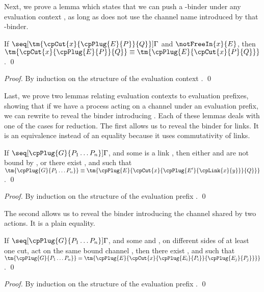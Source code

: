 \documentclass[UKenglish]{llncs}
\begin{document}
Next, we prove a lemma which states that we can push a \textnu-binder under any
evaluation context , as long as  does not use the channel name
introduced by that \textnu-binder.
\begin{lemma}\label{thm:cp-display-cut}
  If $\seq[{ \tm{\cpCut{x}{\cpPlug{E}{P}}{Q}} }]{ \Gamma }$ and
  $\notFreeIn{x}{E}$, then $\tm{\cpCut{x}{\cpPlug{E}{P}}{Q}} \equiv
  \tm{\cpPlug{E}{\cpCut{x}{P}{Q}}}$. 
  \qed
\end{lemma}
\begin{proof}
  By induction on the structure of the evaluation context .
  \qed
\end{proof}
Last, we prove two lemmas relating evaluation contexts to evaluation prefixes,
showing that if we have a process acting on a channel  under an evaluation
prefix, we can rewrite to reveal the binder introducing .
Each of these lemmas deals with one of the cases for reduction.
The first allows us to reveal the binder for links.
It is an equivalence instead of an equality because it uses commutativity of
links.
\begin{lemma}\label{thm:cp-progress-link}
  If $\seq[{ \cpPlug{G}{P_1 \dots P_n} }]{ \Gamma }$, and some  is a
  link , then either  and  are not bound by
  , or there exist ,  and  such that
  \(
  \tm{\cpPlug{G}{P_1 \dots P_n}} \equiv
  \tm{\cpPlug{E}{\cpCut{x}{\cpPlug{E'}{\cpLink{x}{y}}}{Q}}}
  \).
  \qed
\end{lemma}
\begin{proof}
  By induction on the structure of the evaluation prefix .
  \qed
\end{proof}
The second allows us to reveal the binder introducing the channel shared by two
actions. It is a plain equality.
\begin{lemma}\label{thm:cp-progress-beta}
  If $\seq[{ \cpPlug{G}{P_1 \dots P_n} }]{ \Gamma }$, and some  and
  , on different sides of at least one cut, act on the same bound
  channel , then there exist ,  and  such that 
  \(
  \tm{\cpPlug{G}{P_1 \dots P_n}} =
  \tm{\cpPlug{E}{\cpCut{x}{\cpPlug{E_i}{P_i}}{\cpPlug{E_j}{P_j}}}}
  \).
  \qed
\end{lemma}
\begin{proof}
  By induction on the structure of the evaluation prefix .
  \qed
\end{proof}
\end{document}
